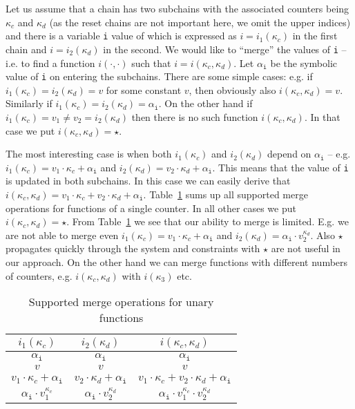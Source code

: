 \documentclass{llncs}
\begin{document}
Let us assume that a chain has two subchains with the associated counters
being $\kappa_c$ and $\kappa_d$ (as the reset chains are not important
here, we omit the upper indices) and there is a variable \texttt{i} value of which
is expressed as $i=i_1(\kappa_c)$ in the first chain and $i=i_2(\kappa_d)$
in the second. We would like to ``merge'' the values of \texttt{i} -- i.e. to find
a function $i(\cdot,\cdot)$ such that $i=i(\kappa_c,\kappa_d)$. Let $\alpha_\mathtt{i}$
be the symbolic value of \texttt{i} on entering the subchains. There are
some simple cases: e.g. if $i_1(\kappa_c)=i_2(\kappa_d)=v$ for some constant
$v$, then obviously also $i(\kappa_c,\kappa_d)=v$. Similarly if
$i_1(\kappa_c)=i_2(\kappa_d)=\alpha_\mathtt{i}$. On the other hand if
$i_1(\kappa_c)=v_1\not=v_2=i_2(\kappa_d)$ then there is no such function
$i(\kappa_c,\kappa_d)$. In that case we put $i(\kappa_c,\kappa_d)=\star$.

The most interesting case is when both $i_1(\kappa_c)$ and $i_2(\kappa_d)$
depend on $\alpha_\mathtt{i}$ -- e.g.  $i_1(\kappa_c) = v_1\cdot\kappa_c +
\alpha_\mathtt{i}$ and $i_2(\kappa_d) = v_2\cdot\kappa_d + \alpha_\mathtt{i}$. This means that
the value of \texttt{i} is updated in both subchains. In this case we can easily
derive that $i(\kappa_c,\kappa_d)=v_1\cdot\kappa_c + v_2\cdot\kappa_d +
\alpha_\mathtt{i}$. Table~\ref{tab:merging} sums up all supported merge operations
for functions of a single counter. In all other cases we put
$i(\kappa_c,\kappa_d)=\star$.  
From Table~\ref{tab:merging} we see that our ability to merge is
limited. E.g. we are not able to merge even $i_1(\kappa_c) =
v_1\cdot\kappa_c + \alpha_\mathtt{i}$ and $i_2(\kappa_d) =
\alpha_\mathtt{i}\cdot v_2^{\kappa_d}$. Also $\star$ propagates quickly
through the system and constraints with $\star$ are not useful in our
approach.
On the other hand we can merge functions with
different numbers of counters, e.g.  $i(\kappa_c,\kappa_d)$ with
$i(\kappa_3)$ etc.

\begin{table}[!htbp]
  \centering
  \begin{tabular}{|c|c|c|}
    \hline
    $i_1(\kappa_c)$ & $i_2(\kappa_d)$ & $i(\kappa_c,\kappa_d)$ \\
    \hline
    $\alpha_\mathtt{i}$ & $\alpha_\mathtt{i}$ & $\alpha_\mathtt{i}$ \\
    $v$ & $v$ & $v$\\
    $v_1\cdot\kappa_c + \alpha_\mathtt{i}$ & $v_2\cdot\kappa_d + \alpha_\mathtt{i}$ & 
    $v_1\cdot\kappa_c + v_2\cdot\kappa_d + \alpha_\mathtt{i}$  \\
    $\alpha_\mathtt{i}\cdot v_1^{\kappa_c}$ & $\alpha_\mathtt{i}\cdot v_2^{\kappa_d}$ & 
    $\alpha_\mathtt{i}\cdot v_1^{\kappa_c}\cdot v_2^{\kappa_d}$ \\
    \hline 
  \end{tabular}
\medskip

  \caption{Supported merge operations for unary functions}
  \label{tab:merging}
\vspace{-1.2cm}
\end{table}
\end{document}
